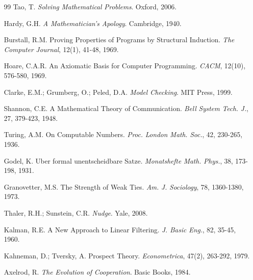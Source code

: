 \documentclass[5p]{elsarticle}
\begin{document}
\begin{thebibliography}{99}
Tao, T. \textit{Solving Mathematical Problems}. Oxford, 2006.

Hardy, G.H. \textit{A Mathematician's Apology}. Cambridge, 1940.

Burstall, R.M. Proving Properties of Programs by Structural Induction. \textit{The Computer Journal}, 12(1), 41-48, 1969.

Hoare, C.A.R. An Axiomatic Basis for Computer Programming. \textit{CACM}, 12(10), 576-580, 1969.

Clarke, E.M.; Grumberg, O.; Peled, D.A. \textit{Model Checking}. MIT Press, 1999.

Shannon, C.E. A Mathematical Theory of Communication. \textit{Bell System Tech. J.}, 27, 379-423, 1948.

Turing, A.M. On Computable Numbers. \textit{Proc. London Math. Soc.}, 42, 230-265, 1936.

Godel, K. Uber formal unentscheidbare Satze. \textit{Monatshefte Math. Phys.}, 38, 173-198, 1931.

Granovetter, M.S. The Strength of Weak Ties. \textit{Am. J. Sociology}, 78, 1360-1380, 1973.

Thaler, R.H.; Sunstein, C.R. \textit{Nudge}. Yale, 2008.

Kalman, R.E. A New Approach to Linear Filtering. \textit{J. Basic Eng.}, 82, 35-45, 1960.

Kahneman, D.; Tversky, A. Prospect Theory. \textit{Econometrica}, 47(2), 263-292, 1979.

Axelrod, R. \textit{The Evolution of Cooperation}. Basic Books, 1984.

\end{thebibliography}
\end{document}
